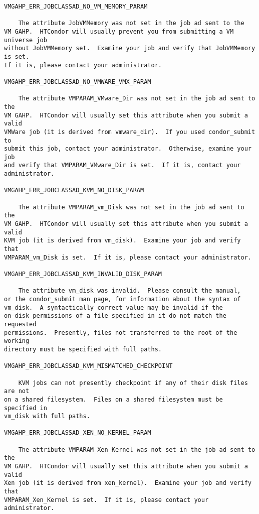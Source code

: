 \begin{verbatim}
VMGAHP_ERR_JOBCLASSAD_NO_VM_MEMORY_PARAM

    The attribute JobVMMemory was not set in the job ad sent to the
VM GAHP.  HTCondor will usually prevent you from submitting a VM universe job
without JobVMMemory set.  Examine your job and verify that JobVMMemory is set.
If it is, please contact your administrator.

VMGAHP_ERR_JOBCLASSAD_NO_VMWARE_VMX_PARAM

    The attribute VMPARAM_VMware_Dir was not set in the job ad sent to the
VM GAHP.  HTCondor will usually set this attribute when you submit a valid
VMWare job (it is derived from vmware_dir).  If you used condor_submit to
submit this job, contact your administrator.  Otherwise, examine your job
and verify that VMPARAM_VMware_Dir is set.  If it is, contact your
administrator.

VMGAHP_ERR_JOBCLASSAD_KVM_NO_DISK_PARAM

    The attribute VMPARAM_vm_Disk was not set in the job ad sent to the
VM GAHP.  HTCondor will usually set this attribute when you submit a valid
KVM job (it is derived from vm_disk).  Examine your job and verify that
VMPARAM_vm_Disk is set.  If it is, please contact your administrator.

VMGAHP_ERR_JOBCLASSAD_KVM_INVALID_DISK_PARAM

    The attribute vm_disk was invalid.  Please consult the manual,
or the condor_submit man page, for information about the syntax of
vm_disk.  A syntactically correct value may be invalid if the
on-disk permissions of a file specified in it do not match the requested
permissions.  Presently, files not transferred to the root of the working
directory must be specified with full paths.

VMGAHP_ERR_JOBCLASSAD_KVM_MISMATCHED_CHECKPOINT

    KVM jobs can not presently checkpoint if any of their disk files are not
on a shared filesystem.  Files on a shared filesystem must be specified in
vm_disk with full paths.

VMGAHP_ERR_JOBCLASSAD_XEN_NO_KERNEL_PARAM

    The attribute VMPARAM_Xen_Kernel was not set in the job ad sent to the
VM GAHP.  HTCondor will usually set this attribute when you submit a valid
Xen job (it is derived from xen_kernel).  Examine your job and verify that
VMPARAM_Xen_Kernel is set.  If it is, please contact your administrator.


\end{verbatim}
